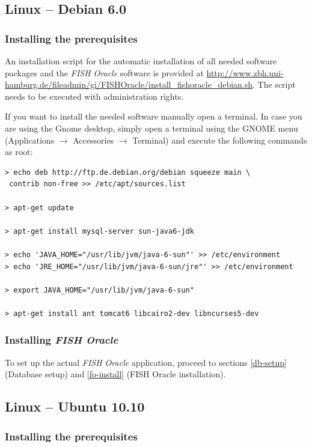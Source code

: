 \documentclass[11pt,final]{article}
\newcommand{\FO}[0]{\emph{FISH Oracle}\xspace}
\begin{document}
\subsection{Linux -- Debian 6.0}
\label{debian}

\subsubsection*{Installing the prerequisites}

An installation script for the automatic installation of all needed software
packages and the \FO software is provided at
\url{http://www.zbh.uni-hamburg.de/fileadmin/gi/FISHOracle/install_fishoracle_debian.sh}.
The script needs to be executed with administration rights.

If you want to install the needed software manually open a terminal.
In case you are using the Gnome desktop, simply open a terminal using the GNOME
menu (Applications $\rightarrow$ Accessories $\rightarrow$ Terminal) and
execute the following commands as root:

\begin{lstlisting}
> echo deb http://ftp.de.debian.org/debian squeeze main \
 contrib non-free >> /etc/apt/sources.list

> apt-get update

> apt-get install mysql-server sun-java6-jdk

> echo 'JAVA_HOME="/usr/lib/jvm/java-6-sun"' >> /etc/environment
> echo 'JRE_HOME="/usr/lib/jvm/java-6-sun/jre"' >> /etc/environment

> export JAVA_HOME="/usr/lib/jvm/java-6-sun"

> apt-get install ant tomcat6 libcairo2-dev libncurses5-dev
\end{lstlisting}

\subsubsection*{Installing \FO}

To set up the actual \FO application, proceed to sections \ref{db-setup}
(Database setup) and \ref{fo-install} (FISH Oracle installation).

\subsection{Linux -- Ubuntu 10.10}
\label{ubuntu}

\subsubsection*{Installing the prerequisites}
\end{document}
